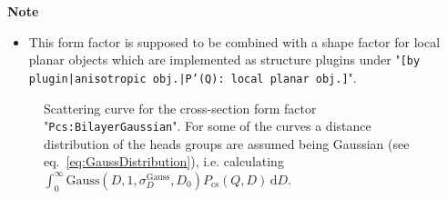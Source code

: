\noindent
\textbf{Note}
\begin{itemize}
  \item This form factor is supposed to be combined with a shape factor for
local planar objects which are implemented as structure  plugins
under "\texttt{[by plugin|anisotropic obj.|P'(Q): local planar
obj.]}".
\end{itemize}

\begin{figure}[htb]
\begin{center}
\hfill
{}
\end{center}
\caption{Scattering curve for the cross-section form factor "\texttt{Pcs:BilayerGaussian}". For some of the curves a distance distribution of
the heads groups are assumed being Gaussian (see eq.\ \ref{eq:GaussDistribution}), i.e. calculating
$\int_0^\infty \mathrm{Gauss}(D,1,\sigma_D^\textrm{Gauss},D_0) P_\text{cs}\left(Q,D\right)\, \mathrm{d}D$.}
\label{fig:BiLayerGaussianProfileIQ}
\end{figure}


